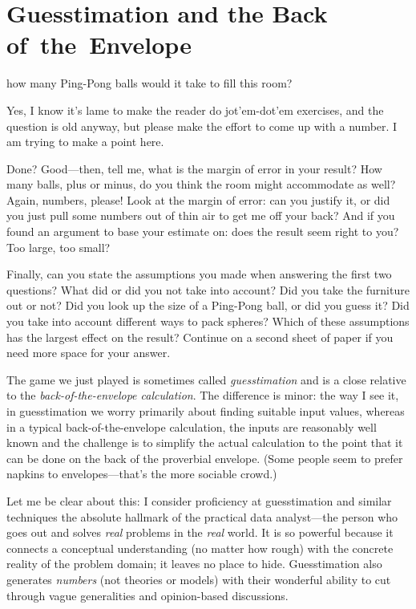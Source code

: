 

\chapter{Guesstimation and the Back of~the~Envelope}{}{}
\label{ch:guesstimation}
  
    
 how many Ping-Pong balls would it take to fill
this room?
    
Yes, I know it's lame to make the reader do jot'em-dot'em exercises,
and the question is old anyway, but please make the effort to come up
with a number. I am trying to make a point here.
    
Done? Good---then, tell me, what is the margin of error in your
result? How many balls, plus or minus, do you think the room might
accommodate as well? Again, numbers, please! Look at the margin of
error: can you justify it, or did you just pull some numbers out of
thin air to get me off your back? And if you found an argument to base
your estimate on: does the result seem right to you? Too large, too
small?
    
Finally, can you state the assumptions you made when answering the
first two questions? What did or did you not take into account? Did
you take the furniture out or not? Did you look up the size of a
Ping-Pong ball, or did you guess it? Did you take into account
different ways to pack spheres? Which of these assumptions has the
largest effect on the result? Continue on a second sheet of paper if
you need more space for your answer.

The game we just played is sometimes called \emph{guesstimation} and
is a close relative to the \emph{back-of-the-envelope calculation}.
The difference is minor: the way I see it, in guesstimation we worry
primarily about finding suitable input values, whereas in a typical
back-of-the-envelope calculation, the inputs are reasonably well known
and the challenge is to simplify the actual calculation to the point
that it can be done on the back of the proverbial envelope.  (Some
people seem to prefer napkins to envelopes---that's the more sociable
crowd.)
    
Let me be clear about this: I consider proficiency at guesstimation
and similar techniques the absolute hallmark of the practical data
analyst---the person who goes out and solves \emph{real} problems in
the \emph{real} world. It is so powerful because it connects a
conceptual understanding (no matter how rough) with the concrete
reality of the problem domain; it leaves no place to hide.
Guesstimation also generates \emph{numbers} (not theories or models)
with their wonderful ability to cut through vague generalities and
opinion-based discussions.
    
